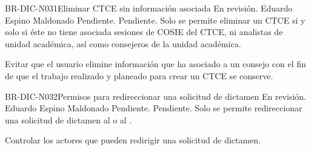 \begin{BusinessRule}{BR-DIC-N031}{Eliminar CTCE sin información asociada}
	{\bcCondition} %
	{\btTimer}     %
	{\blControlling}     %
	\BRItem[Estado] En revisión.
	 Eduardo Espino Maldonado
	 Pendiente.
	 Pendiente.
	\BRItem[Descripción] Solo se permite eliminar un CTCE si y solo si éste no tiene asociada sesiones de COSIE del CTCE, ni analistas de unidad académica, así como consejeros de la unidad académica.
	\BRItem[Sentencia] \cdtEmpty
	
	\cdtEmpty
	\BRItem[Motivación] Evitar que el usuario elimine información que ha asociado a un consejo con el fin de que el trabajo realizado y planeado para crear un CTCE se conserve.
\end{BusinessRule}

\begin{BusinessRule}{BR-DIC-N032}{Permisos para redireccionar una solicitud de dictamen}
	{\bcAutorization} %
	{\btEnabler}     %
	{\blControlling}     %
	\BRItem[Estado] En revisión.
	 Eduardo Espino Maldonado
	 Pendiente.
	 Pendiente.
	\BRItem[Descripción] Solo se permite redireccionar una solicitud de dictamen al  o al .
	\BRItem[Sentencia] \cdtEmpty
	
	\BRItem[Motivación] Controlar los actores que pueden redirigir una solicitud de dictamen.
\end{BusinessRule}


